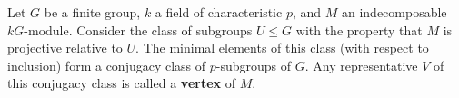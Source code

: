 Let $G$ be a finite group, $k$ a field of characteristic $p$, and $M$ an indecomposable $kG$-module. Consider the class of subgroups $U \leq G$ with the property that $M$ is projective relative to $U$. The minimal elements of this class (with respect to inclusion) form a conjugacy class of $p$-subgroups of $G$. Any representative $V$ of this conjugacy class is called a \textbf{vertex} of $M$.
